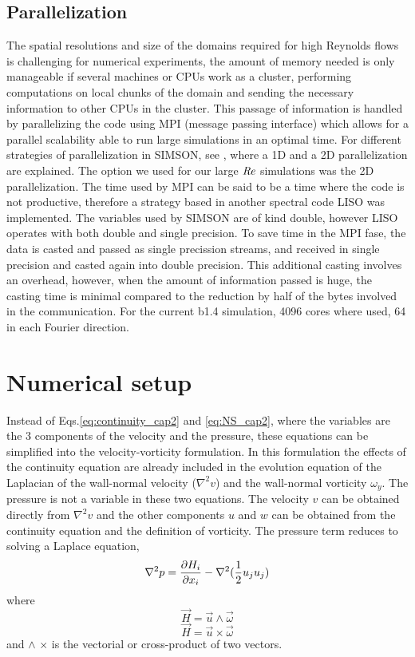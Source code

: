 \subsection{Parallelization}
The spatial resolutions and size of the domains required for high Reynolds flows is challenging for numerical experiments, the amount of memory needed is only manageable if several machines or CPUs work as a cluster, performing computations on local chunks of the domain and sending the necessary information to other CPUs in the cluster. 
This passage of information is handled by parallelizing the code using  MPI (message passing interface) which allows for a parallel scalability able to run large simulations in an optimal time.
For different strategies of parallelization in SIMSON, see \cite{MPI_SIMSON_Qiang}, where a 1D and a 2D parallelization are explained. 
The option we used for our large $\mbox{\textit{Re}}$ simulations was the 2D parallelization.
The time used by MPI can be said to be a time where the code is not productive, therefore a strategy based in another spectral code LISO \citep{Liso_Hoyas_PRL_2006} was implemented. The variables used by SIMSON are of kind double, however LISO operates with both double and single precision. To save time in the MPI fase, the data is casted and passed as single precission streams, and received in single precision and casted again into double precision.
This additional casting involves an overhead, however, when the amount of information passed is huge, the casting time is minimal compared to the reduction by half of the bytes involved in the communication.
For the current b1.4 simulation, 4096 cores where used, 64 in each Fourier direction.




\section{Numerical setup} \label{sec:NumSetUp}
Instead of Eqs.\ref{eq:continuity_cap2} and \ref{eq:NS_cap2}, where the variables are the 3 components of the velocity and the pressure, these equations can be simplified into the 
velocity-vorticity formulation. In this formulation the effects of the continuity equation are already included in the evolution equation of the Laplacian of the wall-normal velocity ($\nabla^2 v$) and the wall-normal vorticity $\omega_y$. The pressure is not a variable in these two equations. The velocity $v$ can be obtained directly from $\nabla^2 v$ and the other components $u$ and $w$ can be obtained from the continuity equation and the definition of vorticity.
The pressure term reduces to solving a Laplace equation,
\begin{equation}
    \nabla^2 p = \pdv{H_i}{x_i} - \nabla^2 (\frac{1}{2} u_j u_j)
\end{equation}
where
\begin{equation}
    \vec{H} = \vec{u} \land \vec{\omega }
\end{equation}
\begin{equation}
    \vec{H} = \vec{u} \times \vec{\omega }
\end{equation}
and $\land$ $\times$ is the vectorial or cross-product of two vectors.

